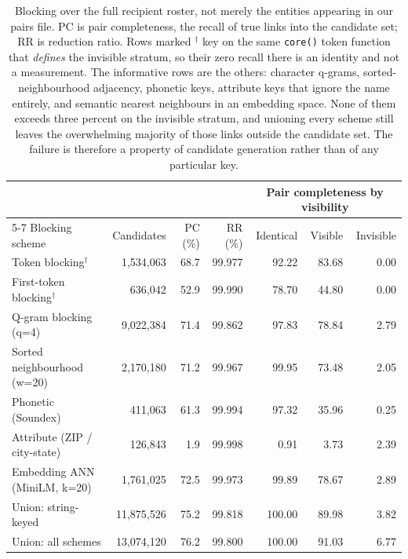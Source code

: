 \begin{table}[t]
\centering
\small
\begin{tabular}{lrrrrrr}
\toprule
& & & & \multicolumn{3}{c}{Pair completeness by visibility} \\
\cmidrule(lr){5-7}
Blocking scheme & Candidates & PC (\%) & RR (\%) & Identical & Visible & Invisible \\
\midrule
Token blocking$^\dagger$ & 1,534,063 & 68.7 & 99.977 & 92.22 & 83.68 & 0.00 \\
First-token blocking$^\dagger$ & 636,042 & 52.9 & 99.990 & 78.70 & 44.80 & 0.00 \\
Q-gram blocking (q=4) & 9,022,384 & 71.4 & 99.862 & 97.83 & 78.84 & 2.79 \\
Sorted neighbourhood (w=20) & 2,170,180 & 71.2 & 99.967 & 99.95 & 73.48 & 2.05 \\
Phonetic (Soundex) & 411,063 & 61.3 & 99.994 & 97.32 & 35.96 & 0.25 \\
Attribute (ZIP / city-state) & 126,843 & 1.9 & 99.998 & 0.91 & 3.73 & 2.39 \\
Embedding ANN (MiniLM, k=20) & 1,761,025 & 72.5 & 99.973 & 99.89 & 78.67 & 2.89 \\
\midrule
Union: string-keyed & 11,875,526 & 75.2 & 99.818 & 100.00 & 89.98 & 3.82 \\
Union: all schemes & 13,074,120 & 76.2 & 99.800 & 100.00 & 91.03 & 6.77 \\
\bottomrule
\end{tabular}
\caption{Blocking over the full recipient roster, not merely the entities appearing in
our pairs file. PC is pair completeness, the recall of true links into the candidate
set; RR is reduction ratio. Rows marked $^\dagger$ key on the same \texttt{core()}
token function that \emph{defines} the invisible stratum, so their zero recall there is
an identity and not a measurement. The informative rows are the others: character
q-grams, sorted-neighbourhood adjacency, phonetic keys, attribute keys that ignore the
name entirely, and semantic nearest neighbours in an embedding space. None of them
exceeds three percent on the invisible stratum, and unioning every scheme still leaves
the overwhelming majority of those links outside the candidate set. The failure is
therefore a property of candidate generation rather than of any particular key.}
\label{tab:blocking}
\end{table}
